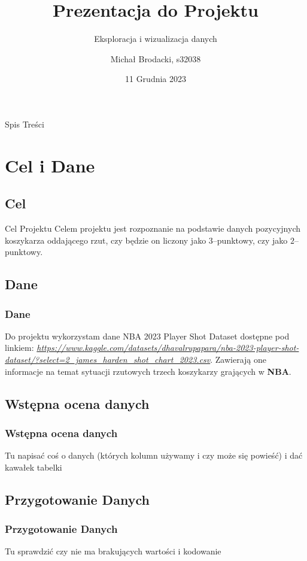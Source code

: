 \documentclass{beamer}
\title{Prezentacja do Projektu}
\subtitle{Eksploracja i wizualizacja danych}
\author{Michał Brodacki, s32038}
\institute{Polsko--Japońska Akademia Technik Komputerowych}
\date{11 Grudnia 2023}
\begin{document}
	\begin{frame}
		\titlepage
	\end{frame}
	\begin{frame}{Spis Treści}
		\tableofcontents %
	\end{frame}
	
	\section{Cel i Dane}
	\subsection{Cel}
	\begin{frame}
		\begin{block}{Cel Projektu}
		Celem projektu jest rozpoznanie na podstawie danych pozycyjnych koszykarza oddającego rzut, czy będzie on liczony jako $3$--punktowy, czy jako $2$--punktowy.
		\end{block}

	\end{frame}
	\subsection{Dane}
\begin{frame}
	\frametitle{Dane}
Do projektu wykorzystam dane NBA 2023 Player Shot Dataset dostępne pod linkiem: 
\textit{\url{https://www.kaggle.com/datasets/dhavalrupapara/nba-2023-player-shot-dataset/?select=2_james_harden_shot_chart_2023.csv}}. Zawierają one informacje na temat sytuacji rzutowych trzech koszykarzy grających w \textbf{NBA}.
\end{frame}

	\subsection{Wstępna ocena danych}
\begin{frame}
	\frametitle{Wstępna ocena danych}
	Tu napisać coś o danych (których kolumn używamy i czy może się powieść) i dać kawałek tabelki
	
\end{frame}
\subsection{Przygotowanie Danych}
	\begin{frame}
		\frametitle{Przygotowanie Danych}
		Tu sprawdzić czy nie ma brakujących wartości i kodowanie
		
	\end{frame}
\end{document}
